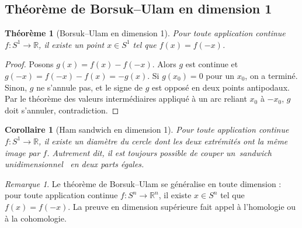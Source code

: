 \documentclass[12pt,a4paper,openany]{book}
\theoremstyle{definition}
\theoremstyle{plain}
\newtheorem{theoreme}[definition]{Théorème}
\newtheorem{corollaire}[definition]{Corollaire}
\theoremstyle{remark}
\newtheorem{remarque}[definition]{Remarque}
\newcommand{\R}{\mathbb{R}}
\providecommand{\og}{\guillemotleft\,}
\providecommand{\fg}{\,\guillemotright}
\begin{document}
\begin{center}
\label{fig:brouwer}
\end{center}

\subsection{Théorème de Borsuk--Ulam en dimension 1}\label{subsec:borsuk-ulam}

\begin{theoreme}[Borsuk--Ulam en dimension 1]\label{thm:borsuk-ulam-1}
Pour toute application continue $f : S^1 \to \R$, il existe un point $x \in S^1$
tel que $f(x) = f(-x)$.
\end{theoreme}

\begin{proof}
Posons $g(x) = f(x) - f(-x)$. Alors $g$ est continue et
$g(-x) = f(-x) - f(x) = -g(x)$. Si $g(x_0) = 0$ pour un $x_0$, on a terminé.
Sinon, $g$ ne s'annule pas, et le signe de $g$ est opposé en deux points
antipodaux. Par le théorème des valeurs intermédiaires appliqué à un arc reliant
$x_0$ à $-x_0$, $g$ doit s'annuler, contradiction.
\end{proof}

\begin{corollaire}[Ham sandwich en dimension 1]\label{cor:ham-sandwich-1}
Pour toute application continue $f : S^1 \to \R$, il existe un diamètre du
cercle dont les deux extrémités ont la même image par $f$. Autrement dit, il
est toujours possible de couper un \og sandwich unidimensionnel \fg{} en deux
parts égales.
\end{corollaire}

\begin{remarque}\label{rem:borsuk-ulam-generalisation}
Le théorème de Borsuk--Ulam se généralise en toute dimension : pour toute
application continue $f : S^n \to \R^n$, il existe $x \in S^n$ tel que
$f(x) = f(-x)$. La preuve en dimension supérieure fait appel à l'homologie ou à
la cohomologie.
\end{remarque}
\end{document}
